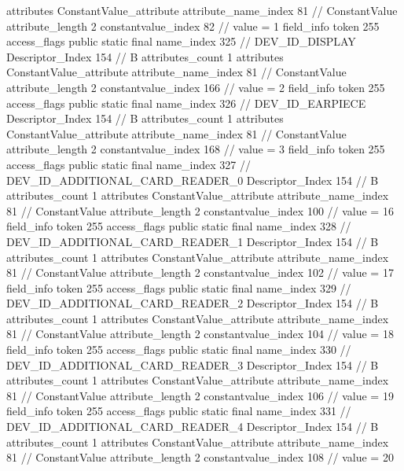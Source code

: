 {{{{{				attributes {
				ConstantValue_attribute {
					attribute_name_index	81		// ConstantValue
					attribute_length	2
					constantvalue_index	82		// value = 1
				}
				}
			}
			field_info {
				token	255
				access_flags	public static final
				name_index	325		// DEV_ID_DISPLAY
				Descriptor_Index	154		// B
				attributes_count	1
				attributes {
				ConstantValue_attribute {
					attribute_name_index	81		// ConstantValue
					attribute_length	2
					constantvalue_index	166		// value = 2
				}
				}
			}
			field_info {
				token	255
				access_flags	public static final
				name_index	326		// DEV_ID_EARPIECE
				Descriptor_Index	154		// B
				attributes_count	1
				attributes {
				ConstantValue_attribute {
					attribute_name_index	81		// ConstantValue
					attribute_length	2
					constantvalue_index	168		// value = 3
				}
				}
			}
			field_info {
				token	255
				access_flags	public static final
				name_index	327		// DEV_ID_ADDITIONAL_CARD_READER_0
				Descriptor_Index	154		// B
				attributes_count	1
				attributes {
				ConstantValue_attribute {
					attribute_name_index	81		// ConstantValue
					attribute_length	2
					constantvalue_index	100		// value = 16
				}
				}
			}
			field_info {
				token	255
				access_flags	public static final
				name_index	328		// DEV_ID_ADDITIONAL_CARD_READER_1
				Descriptor_Index	154		// B
				attributes_count	1
				attributes {
				ConstantValue_attribute {
					attribute_name_index	81		// ConstantValue
					attribute_length	2
					constantvalue_index	102		// value = 17
				}
				}
			}
			field_info {
				token	255
				access_flags	public static final
				name_index	329		// DEV_ID_ADDITIONAL_CARD_READER_2
				Descriptor_Index	154		// B
				attributes_count	1
				attributes {
				ConstantValue_attribute {
					attribute_name_index	81		// ConstantValue
					attribute_length	2
					constantvalue_index	104		// value = 18
				}
				}
			}
			field_info {
				token	255
				access_flags	public static final
				name_index	330		// DEV_ID_ADDITIONAL_CARD_READER_3
				Descriptor_Index	154		// B
				attributes_count	1
				attributes {
				ConstantValue_attribute {
					attribute_name_index	81		// ConstantValue
					attribute_length	2
					constantvalue_index	106		// value = 19
				}
				}
			}
			field_info {
				token	255
				access_flags	public static final
				name_index	331		// DEV_ID_ADDITIONAL_CARD_READER_4
				Descriptor_Index	154		// B
				attributes_count	1
				attributes {
				ConstantValue_attribute {
					attribute_name_index	81		// ConstantValue
					attribute_length	2
					constantvalue_index	108		// value = 20
}}}}}}}
